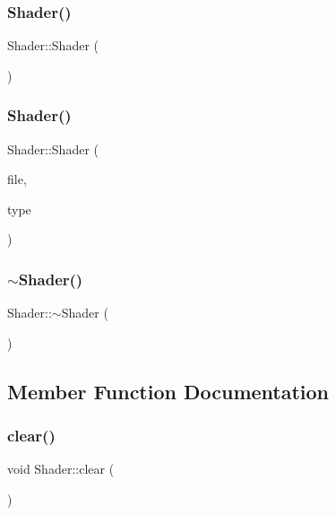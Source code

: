 \subsubsection{\texorpdfstring{Shader()}{Shader()}\hspace{0.1cm}{\footnotesize\ttfamily [1/2]}}
{\footnotesize\ttfamily Shader\+::\+Shader (\begin{DoxyParamCaption}{ }\end{DoxyParamCaption})}

\mbox{\label{classShader_a7933b4a0a4d8446c8df9e3c6118a80bf}} 
\subsubsection{\texorpdfstring{Shader()}{Shader()}\hspace{0.1cm}{\footnotesize\ttfamily [2/2]}}
{\footnotesize\ttfamily Shader\+::\+Shader (\begin{DoxyParamCaption}\item[{string}]{file,  }\item[{G\+Lenum}]{type }\end{DoxyParamCaption})}

\mbox{\label{classShader_aff01df87e8a102f270b5b135a295e59d}} 
\subsubsection{\texorpdfstring{$\sim$\+Shader()}{~Shader()}}
{\footnotesize\ttfamily Shader\+::$\sim$\+Shader (\begin{DoxyParamCaption}{ }\end{DoxyParamCaption})}



\subsection{Member Function Documentation}
\mbox{\label{classShader_a59d3c7d6dcb0d0801e836b7a11d8095f}} 
\subsubsection{\texorpdfstring{clear()}{clear()}}
{\footnotesize\ttfamily void Shader\+::clear (\begin{DoxyParamCaption}{ }\end{DoxyParamCaption})}

